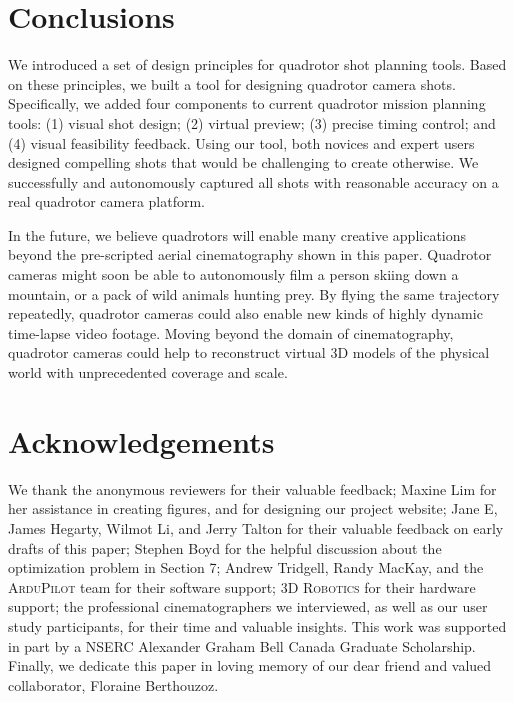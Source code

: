 \section{Conclusions}

We introduced a set of design principles for quadrotor shot planning tools.
Based on these principles, we built a tool for designing quadrotor camera shots.
Specifically, we added four components to current quadrotor mission planning tools: (1) visual shot design; (2) virtual preview; (3) precise timing control; and (4) visual feasibility feedback. 
Using our tool, both novices and expert users designed compelling shots that would be challenging to create otherwise.
We successfully and autonomously captured all shots with reasonable accuracy on a real quadrotor camera platform.

In the future, we believe quadrotors will enable many creative applications beyond the pre-scripted aerial cinematography shown in this paper.
Quadrotor cameras might soon be able to autonomously film a person skiing down a mountain, or a pack of wild animals hunting prey. 
By flying the same trajectory repeatedly, quadrotor cameras could also enable new kinds of highly dynamic time-lapse video footage.
Moving beyond the domain of cinematography, quadrotor cameras could help to reconstruct virtual 3D models of the physical world with unprecedented coverage and scale.

\section*{Acknowledgements}
We thank the anonymous reviewers for their valuable feedback;
Maxine Lim for her assistance in creating figures, and for designing our project website;
Jane E, James Hegarty, Wilmot Li, and Jerry Talton for their valuable feedback on early drafts of this paper;
Stephen Boyd for the helpful discussion about the optimization problem in Section 7;
Andrew Tridgell, Randy MacKay, and the \textsc{ArduPilot} team for their software support;
\textsc{3D Robotics} for their hardware support;
the professional cinematographers we interviewed, as well as our user study participants, for their time and valuable insights.
This work was supported in part by a NSERC Alexander Graham Bell Canada Graduate Scholarship.
Finally, we dedicate this paper in loving memory of our dear friend and valued collaborator, Floraine Berthouzoz.


